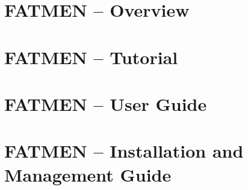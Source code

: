 \newcommand{\Sboxii}[4]%
{\par\leavevmode\vspace*{\baselineskip}
\fbox{\rule[-1ex]{0mm}{3ex}\quad\tt\bf#3\quad{\rm and}\quad#4\quad}
\par\label{#1}\index{#1!defined}\label{#2}\index{#2!defined}%
\Rkeep{#1}{#3}\Rkeep{#2}{#4}%
}%
 
\renewenvironment{DL}[1]{%
\begin{list}{\phantom{\bf#1\quad}}
   {\settowidth{\labelwidth}{\bf#1\quad}%
    \setlength{\leftmargin}{\labelwidth}%
    \setlength{\itemindent}{0pt}%
    \setlength{\labelsep}{5pt}%
    \setlength{\itemsep}{1pt}%
    \setlength{\parsep}{0pt}%
    \setlength{\topsep}{.2\baselineskip}%
    \renewcommand{\makelabel}[1]{\bf##1\hfil}}}%
{\end{list}}%
 
\ifx\selectfont\undefined
\newcommand{\Ttt}{\tt}
\newcommand{\Stt}[2]{\tt}
\else
\let\oldtt\tt
\def\tt{\oldtt\series{c}\size{9}{11pt}\selectfont}
\newcommand{\Ttt}{\tt}
\newcommand{\Stt}[2]{\oldtt\size{#1}{#2}\selectfont}
\renewcommand{\ttbf}%
{{\tt\size{9}{11pt}\selectfont}}%
\fi
 
\setcounter{secnumdepth}{1}
\setcounter{tocdepth}{2}
 


\setcounter{page}{1}
\part{FATMEN -- Overview}

\part{FATMEN -- Tutorial}

\part{FATMEN -- User Guide}

\part{FATMEN -- Installation and Management Guide}

\begin{appendix}

\end{appendix}



